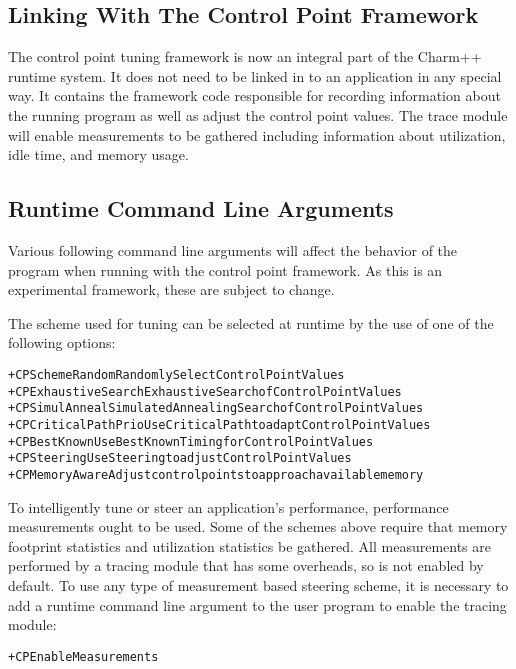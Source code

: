 \subsection{Linking With The Control Point Framework}

The control point tuning framework is now an integral part of the Charm++ runtime system. It does not need to be linked in to an application in any special way. It contains the framework code responsible for recording information about the running program as well as adjust the control point values. The trace module will enable measurements to be gathered including information about utilization, idle time, and memory usage. 

\subsection{Runtime Command Line Arguments}

Various following command line arguments will affect the behavior of the program when running with the control point framework. As this is an experimental framework, these are subject to change.

The scheme used for tuning can be selected at runtime by the use of one of the following options:
\begin{alltt} 
     +CPSchemeRandom            Randomly Select Control Point Values
 +CPExhaustiveSearch            Exhaustive Search of Control Point Values
      +CPSimulAnneal            Simulated Annealing Search of Control Point Values
 +CPCriticalPathPrio            Use Critical Path to adapt Control Point Values
        +CPBestKnown            Use BestKnown Timing for Control Point Values
         +CPSteering            Use Steering to adjust Control Point Values
      +CPMemoryAware            Adjust control points to approach available memory
\end{alltt} 

To intelligently tune or steer an application's performance, performance measurements ought to be used. Some of the schemes above require that memory footprint statistics and utilization statistics be gathered. All measurements are performed by a tracing module that has some overheads, so is not enabled by default. To use any type of measurement based steering scheme, it is necessary to add a runtime command line argument to the user program to enable the tracing module:

\begin{alltt} 
    +CPEnableMeasurements
\end{alltt}

